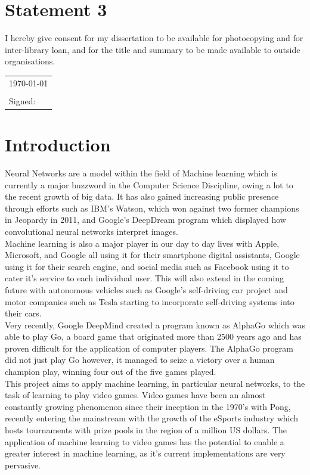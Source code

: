 \documentclass[10pt]{article}
\begin{document}
\section*{Statement 3}

I hereby give consent for my dissertation to be available for
photocopying and for inter-library loan, and for the title and summary
to be made available to outside organisations.

\vspace{0.5cm}
\begin{tabular}{l}
\today\\
\\
Signed:
\end{tabular}

\newpage
\tableofcontents
\newpage

\section{Introduction}
	Neural Networks are a model within the field of Machine learning which is currently a major buzzword in the Computer Science Discipline, owing a lot to the recent growth of big data. It has also gained increasing public presence through efforts such as IBM's Watson, which won against two former champions in Jeopardy in 2011, and Google's DeepDream program which displayed how convolutional neural networks interpret images.\\
	Machine learning is also a major player in our day to day lives with Apple, Microsoft, and Google all using it for their smartphone digital assistants, Google using it for their search engine, and social media such as Facebook using it to cater it's service to each individual user. This will also extend in the coming future with autonomous vehicles such as Google's self-driving car project and motor companies such as Tesla starting to incorporate self-driving systems into their cars.\\
	
	Very recently, Google DeepMind created a program known as AlphaGo which was able to play Go, a board game that originated more than 2500 years ago and has proven difficult for the application of computer players. The AlphaGo program did not just play Go however, it managed to seize a victory over a human champion play, winning four out of the five games played.\\
	
	This project aims to apply machine learning, in particular neural networks, to the task of learning to play video games. Video games have been an almost constantly growing phenomenon since their inception in the 1970's with Pong, recently entering the mainstream with the growth of the eSports industry which hosts tournaments with prize pools in the region of a million US dollars. The application of machine learning to video games has the potential to enable a greater interest in machine learning, as it's current implementations are very pervasive.\\
	
\end{document}
